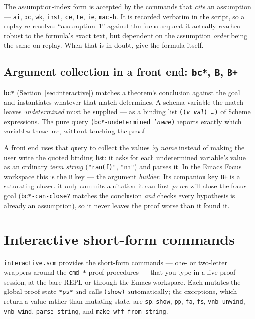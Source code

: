 \begin{remark}
The assumption-index form is accepted by the commands that \emph{cite} an
assumption --- \texttt{ai}, \texttt{bc}, \texttt{wk}, \texttt{inst},
\texttt{ce}, \texttt{te}, \texttt{ie}, \texttt{mac-h}.  It is recorded
verbatim in the script, so a replay re-resolves ``assumption~1'' against
the focus sequent it actually reaches --- robust to the formula's exact
text, but dependent on the assumption \emph{order} being the same on
replay.  When that is in doubt, give the formula itself.
\end{remark}

\subsection{Argument collection in a front end: \texttt{bc*}, \texttt{B}, \texttt{B+}}
\label{sec:bc-star-collection}

\texttt{bc*} (Section~\ref{sec:interactive}) matches a theorem's conclusion
against the goal and instantiates whatever that match determines.  A schema
variable the match leaves \emph{undetermined} must be supplied --- as a
binding list \texttt{((\textit{v}\ \textit{val})\ \ldots)} of Scheme
expressions.  The pure query \texttt{(bc*-undetermined '\textit{name})}
reports exactly which variables those are, without touching the proof.

A front end uses that query to collect the values \emph{by name} instead of
making the user write the quoted binding list: it asks for each undetermined
variable's value as an ordinary \emph{term string} (\texttt{"ran(f)"},
\texttt{"nn"}) and parses it.  In the Emacs Focus workspace this is the
\texttt{B} key --- the argument \emph{builder}.  Its companion key
\texttt{B+} is a saturating closer: it only commits a citation it
can first \emph{prove} will close the focus goal
(\texttt{bc*-can-close?} matches the conclusion \emph{and} checks every
hypothesis is already an assumption), so it never leaves the proof worse
than it found it.

\section{Interactive short-form commands}\label{sec:tactics-ref}
\label{sec:interactive}

\texttt{interactive.scm} provides the short-form commands --- one- or two-letter
wrappers around the \texttt{cmd-*} proof procedures --- that you type in a live
proof session, at the bare REPL or through the Emacs workspace.  Each mutates the
global proof state \texttt{*ps*} and calls \texttt{(show)} automatically; the
exceptions, which return a value rather than mutating state, are \texttt{sp},
\texttt{show}, \texttt{pp}, \texttt{fa}, \texttt{fs}, \texttt{vnb-unwind},
\texttt{vnb-wind}, \texttt{parse-string}, and \texttt{make-wff-from-string}.

